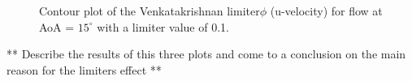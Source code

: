 
\begin{figure}[]
  \begin{subfigmatrix}{2}
    \label{fig:contour_G0}
    \label{fig:contour_G2}
  \end{subfigmatrix}
  
  \caption{Contour plot of the Venkatakrishnan limiter$\phi$ (u-velocity) for flow at AoA = $15^\circ$ with a limiter value of 0.1. }
  \label{fig:limiter_contour}
\end{figure}

** Describe the results of this three plots and come to a conclusion on the main reason for the limiters effect **

